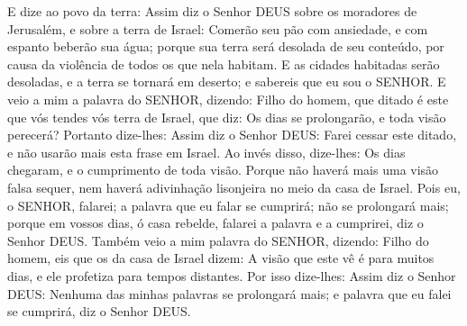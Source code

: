 {E dize ao povo da terra: Assim diz o Senhor DEUS sobre os moradores de Jerusalém, e sobre a terra de Israel: Comerão seu pão com ansiedade, e com espanto beberão sua água; porque sua terra será desolada de seu conteúdo, por causa da violência de todos os que nela habitam.
E as cidades habitadas serão desoladas, e a terra se tornará em deserto; e sabereis que eu sou o SENHOR.
E veio a mim a palavra do SENHOR, dizendo:
Filho do homem, que ditado é este que vós tendes vós terra de Israel, que diz: Os dias se prolongarão, e toda visão perecerá?
Portanto dize-lhes: Assim diz o Senhor DEUS: Farei cessar este ditado, e não usarão mais esta frase em Israel. Ao invés disso, dize-lhes: Os dias chegaram, e o cumprimento de toda visão.
Porque não haverá mais uma visão falsa sequer, nem haverá adivinhação lisonjeira no meio da casa de Israel.
Pois eu, o SENHOR, falarei; a palavra que eu falar se cumprirá; não se prolongará mais; porque em vossos dias, ó casa rebelde, falarei a palavra e a cumprirei, diz o Senhor DEUS.
Também veio a mim palavra do SENHOR, dizendo:
Filho do homem, eis que os da casa de Israel dizem: A visão que este vê é para muitos dias, e ele profetiza para tempos distantes.
Por isso dize-lhes: Assim diz o Senhor DEUS: Nenhuma das minhas palavras se prolongará mais; e palavra que eu falei se cumprirá, diz o Senhor DEUS.

}
